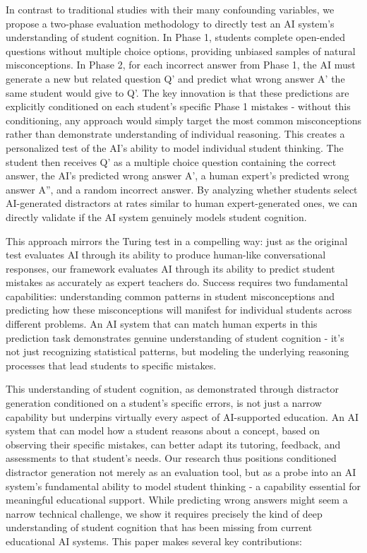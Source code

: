 In contrast to traditional studies with their many confounding variables, we propose a two-phase evaluation methodology to directly test an AI system's understanding of student cognition. In Phase 1, students complete open-ended questions without multiple choice options, providing unbiased samples of natural misconceptions. In Phase 2, for each incorrect answer from Phase 1, the AI must generate a new but related question Q' and predict what wrong answer A' the same student would give to Q'. The key innovation is that these predictions are explicitly conditioned on each student's specific Phase 1 mistakes - without this conditioning, any approach would simply target the most common misconceptions rather than demonstrate understanding of individual reasoning. This creates a personalized test of the AI's ability to model individual student thinking. The student then receives Q' as a multiple choice question containing the correct answer, the AI's predicted wrong answer A', a human expert's predicted wrong answer A'', and a random incorrect answer. By analyzing whether students select AI-generated distractors at rates similar to human expert-generated ones, we can directly validate if the AI system genuinely models student cognition.

This approach mirrors the Turing test in a compelling way: just as the original test evaluates AI through its ability to produce human-like conversational responses, our framework evaluates AI through its ability to predict student mistakes as accurately as expert teachers do. Success requires two fundamental capabilities: understanding common patterns in student misconceptions and predicting how these misconceptions will manifest for individual students across different problems. An AI system that can match human experts in this prediction task demonstrates genuine understanding of student cognition - it's not just recognizing statistical patterns, but modeling the underlying reasoning processes that lead students to specific mistakes.

This understanding of student cognition, as demonstrated through distractor generation conditioned on a student's specific errors, is not just a narrow capability but underpins virtually every aspect of AI-supported education. An AI system that can model how a student reasons about a concept, based on observing their specific mistakes, can better adapt its tutoring, feedback, and assessments to that student's needs. Our research thus positions conditioned distractor generation not merely as an evaluation tool, but as a probe into an AI system's fundamental ability to model student thinking - a capability essential for meaningful educational support. While predicting wrong answers might seem a narrow technical challenge, we show it requires precisely the kind of deep understanding of student cognition that has been missing from current educational AI systems. This paper makes several key contributions:

